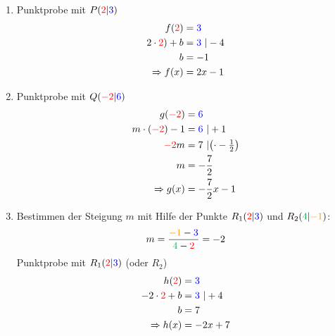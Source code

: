\begin{Answer}[ref=punktprobeA2]
	
	\begin{minipage}[t]{0.5\textwidth}
		\begin{enumerate}[label=\alph*)]
			\item Punktprobe mit \(P(\textcolor{red}{2}\vert\textcolor{blue}{3})\)
			\begin{align*}
				f(\textcolor{red}{2})&=\textcolor{blue}{3}\\
				2\cdot\textcolor{red}{2})+b&=\textcolor{blue}{3}\ \vert-4\\
				b&=-1\\
				\Rightarrow f(x)&=2x-1
			\end{align*}
			\item Punktprobe mit \(Q(\textcolor{red}{-2}\vert\textcolor{blue}{6})\)
			\begin{align*}
				g(\textcolor{red}{-2})&=\textcolor{blue}{6}\\
				m\cdot\left(\textcolor{red}{-2}\right)-1&=\textcolor{blue}{6}\ \vert+1\\
				\textcolor{red}{-2}m&=7\ \vert\left(\cdot -\tfrac{1}{2}\right)\\
				m&=-\dfrac{7}{2}\\
				\Rightarrow g(x)&=-\dfrac{7}{2}x-1
			\end{align*}
		\end{enumerate}
	\end{minipage}%
	\begin{minipage}[t]{0.5\textwidth}
		\begin{enumerate}[label=\alph*)]
			\setcounter{enumi}{2}
			\item Bestimmen der Steigung \(m\) mit Hilfe der Punkte \(R_1(\textcolor{red}{2}\vert\textcolor{blue}{3})\) und \(R_2(\textcolor{ForestGreen}{4}\vert\textcolor{YellowOrange}{-1})\):
			\begin{align*}
				m=\dfrac{\textcolor{YellowOrange}{-1}-\textcolor{blue}{3}}{\textcolor{ForestGreen}{4}-\textcolor{red}{2}}=-2
			\end{align*}
			Punktprobe mit \(R_1(\textcolor{red}{2}\vert\textcolor{blue}{3})\) (oder \(R_2\))
			\begin{align*}
				h(\textcolor{red}{2})&=\textcolor{blue}{3}\\
				-2\cdot\textcolor{red}{2}+b&=\textcolor{blue}{3}\ \vert +4\\
				b&=7\\
				\Rightarrow h(x)&=-2x+7
			\end{align*}

\end{enumerate}
\end{minipage}
\end{Answer}
